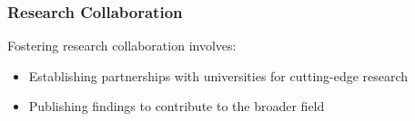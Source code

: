 \documentclass[14pt,a4paper]{article}
\begin{document}
\begin{multicols}{2}





\subsubsection*{Research Collaboration}
Fostering research collaboration \textit{\parencite[pp. 50-100]{Dillenbourg2023}} involves:
\begin{itemize}
    \item Establishing partnerships with universities for cutting-edge research
    \item Publishing findings to contribute to the broader field
\end{itemize}


\end{multicols}
\end{document}
